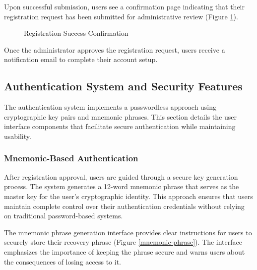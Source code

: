 Upon successful submission, users see a confirmation page indicating that their registration request has been submitted for administrative review (Figure \ref{registration-success}).

\begin{figure}[H]
    \centering
    \caption{Registration Success Confirmation}
    \label{registration-success}
\end{figure}

Once the administrator approves the registration request, users receive a notification email to complete their account setup.

\subsection{Authentication System and Security Features}
The authentication system implements a passwordless approach using cryptographic key pairs and mnemonic phrases. This section details the user interface components that facilitate secure authentication while maintaining usability.

\subsubsection{Mnemonic-Based Authentication}
After registration approval, users are guided through a secure key generation process. The system generates a 12-word mnemonic phrase that serves as the master key for the user's cryptographic identity. This approach ensures that users maintain complete control over their authentication credentials without relying on traditional password-based systems.

The mnemonic phrase generation interface provides clear instructions for users to securely store their recovery phrase (Figure \ref{mnemonic-phrase}). The interface emphasizes the importance of keeping the phrase secure and warns users about the consequences of losing access to it.

